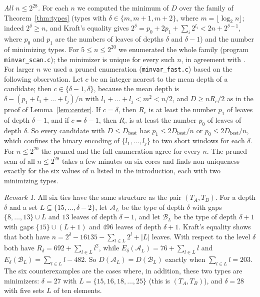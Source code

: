 \documentclass[11pt]{amsart}
\theoremstyle{remark}
\newtheorem{remark}[theorem]{Remark}
\begin{document}
\emph{All $n\le2^{28}$.} For each $n$ we computed the minimum of $D$ over the family of Theorem~\ref{thm:types} (types with $\delta\in\{m,m+1,m+2\}$, where $m=\lfloor\log_2n\rfloor$; indeed $2^\delta\ge n$, and Kraft's equality gives $2^\delta=p_0+2p_1+\sum_i2^{l_i}<2n+2^{\delta-1}$, where $p_0$ and $p_1$ are the numbers of leaves of depths $\delta$ and $\delta-1$) and the number of minimizing types.
For $5\le n\le2^{20}$ we enumerated the whole family (program \texttt{minvar\_scan.c}); the minimizer is unique for every such $n$, in agreement with \cite{CMRR}.
For larger $n$ we used a pruned enumeration (\texttt{minvar\_fast.c}) based on the following observation.
Let $c$ be an integer nearest to the mean depth of a candidate; then $c\in\{\delta-1,\delta\}$, because the mean depth is $\delta-(p_1+l_1+\dots+l_j)/n$ with $l_1+\dots+l_j<m^2<n/2$, and $D\ge nR_c/2$ as in the proof of Lemma~\ref{lem:center}.
If $c=\delta$, then $R_c$ is at least the number $p_1$ of leaves of depth $\delta-1$, and if $c=\delta-1$, then $R_c$ is at least the number $p_0$ of leaves of depth $\delta$.
So every candidate with $D\le D_{\mathrm{best}}$ has $p_1\le 2D_{\mathrm{best}}/n$ or $p_0\le 2D_{\mathrm{best}}/n$, which confines the binary encoding of $\{l_1,\dots,l_j\}$ to two short windows for each $\delta$.
For $n\le2^{20}$ the pruned and the full enumeration agree for every $n$.
The pruned scan of all $n\le2^{28}$ takes a few minutes on six cores and finds non-uniqueness exactly for the six values of $n$ listed in the introduction, each with two minimizing types.

\begin{remark}
All six ties have the same structure as the pair $(T_A,T_B)$.
For a depth $\delta$ and a set $L\subseteq\{15,\dots,\delta-2\}$, let $\mathcal A_L$ be the type of depth $\delta$ with gaps $\{8,\dots,13\}\cup L$ and $13$ leaves of depth $\delta-1$, and let $\mathcal B_L$ be the type of depth $\delta+1$ with gaps $\{15\}\cup(L+1)$ and $496$ leaves of depth $\delta+1$.
Kraft's equality shows that both have $n=2^\delta-16135-\sum_{l\in L}2^l+|L|$ leaves.
With respect to the level $\delta$ both have $R_\delta=692+\sum_{l\in L}l^2$, while $E_\delta(\mathcal A_L)=76+\sum_{l\in L}l$ and $E_\delta(\mathcal B_L)=\sum_{l\in L}l-482$.
So $D(\mathcal A_L)=D(\mathcal B_L)$ exactly when $\sum_{l\in L}l=203$.
The six counterexamples are the cases where, in addition, these two types are minimizers: $\delta=27$ with $L=\{15,16,18,\dots,25\}$ (this is $(T_A,T_B)$), and $\delta=28$ with five sets $L$ of ten elements.
\end{remark}
\end{document}

